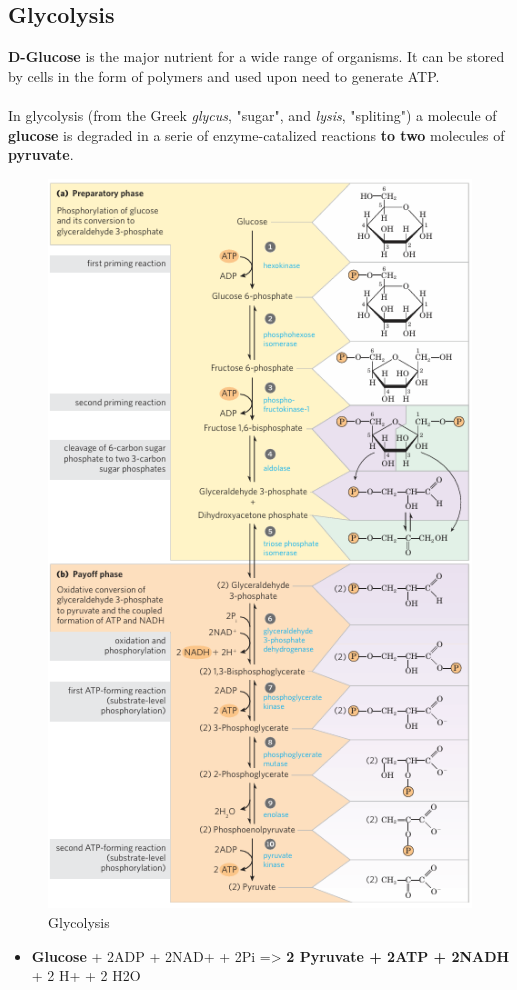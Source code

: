 \documentclass[../main.tex]{subfiles}
\begin{document}
\subsection{Glycolysis}
\textbf{D-Glucose} is the major nutrient for a wide range of organisms. It can be stored by cells in the form of polymers and used upon need to generate ATP. \\
\\
In glycolysis (from the Greek \textit{glycus}, "sugar", and \textit{lysis}, "spliting") a molecule of \textbf{glucose} is degraded in a serie of enzyme-catalized reactions \textbf{to two} molecules of \textbf{pyruvate}.
\begin{figure}[H]
	\centering
	\includegraphics[width = 0.6 \textwidth]{glycolysis_gen}
	\caption{Glycolysis}
\end{figure}
\begin{itemize}
	\item \textbf{Glucose} + 2ADP + 2NAD+ + 2Pi => \textbf{2 Pyruvate + 2ATP + 2NADH} + 2 H+ + 2 H2O
\end{itemize}
\end{document}
